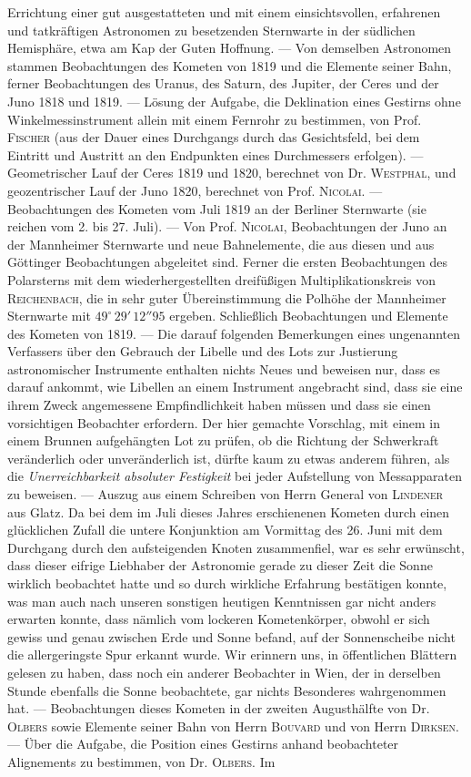 Errichtung einer gut ausgestatteten und mit einem einsichtsvollen, erfahrenen und tatkräftigen Astronomen zu besetzenden Sternwarte in der südlichen Hemisphäre, etwa am Kap der Guten Hoffnung. --- Von demselben Astronomen stammen Beobachtungen des Kometen von 1819 und die Elemente seiner Bahn, ferner Beobachtungen des Uranus, des Saturn, des Jupiter, der Ceres und der Juno 1818 und 1819. --- Lösung der Aufgabe, die Deklination eines Gestirns ohne Winkelmessinstrument allein mit einem Fernrohr zu bestimmen, von Prof. \textsc{Fischer} (aus der Dauer eines Durchgangs durch das Gesichtsfeld, bei dem Eintritt und Austritt an den Endpunkten eines Durchmessers erfolgen). --- Geometrischer Lauf der Ceres 1819 und 1820, berechnet von Dr. \textsc{Westphal}, und geozentrischer Lauf der Juno 1820, berechnet von Prof. \textsc{Nicolai}. --- Beobachtungen des Kometen vom Juli 1819 an der Berliner Sternwarte (sie reichen vom 2. bis 27. Juli). --- Von Prof. \textsc{Nicolai}, Beobachtungen der Juno an der Mannheimer Sternwarte und neue Bahnelemente, die aus diesen und aus Göttinger Beobachtungen abgeleitet sind. Ferner die ersten Beobachtungen des Polarsterns mit dem wiederhergestellten dreifüßigen Multiplikationskreis von \textsc{Reichenbach}, die in sehr guter Übereinstimmung die Polhöhe der Mannheimer Sternwarte mit $49^\circ\,29'\,12''95$ ergeben. Schließlich Beobachtungen und Elemente des Kometen von 1819. --- Die darauf folgenden Bemerkungen eines ungenannten Verfassers über den Gebrauch der Libelle und des Lots zur Justierung astronomischer Instrumente enthalten nichts Neues und beweisen nur, dass es darauf ankommt, wie Libellen an einem Instrument angebracht sind, dass sie eine ihrem Zweck angemessene Empfindlichkeit haben müssen und dass sie einen vorsichtigen Beobachter erfordern. Der hier gemachte Vorschlag, mit einem in einem Brunnen aufgehängten Lot zu prüfen, ob die Richtung der Schwerkraft veränderlich oder unveränderlich ist, dürfte kaum zu etwas anderem führen, als die \emph{Unerreichbarkeit absoluter Festigkeit} bei jeder Aufstellung von Messapparaten zu beweisen. --- Auszug aus einem Schreiben von Herrn General von \textsc{Lindener} aus Glatz. Da bei dem im Juli dieses Jahres erschienenen Kometen durch einen glücklichen Zufall die untere Konjunktion am Vormittag des 26. Juni mit dem Durchgang durch den aufsteigenden Knoten zusammenfiel, war es sehr erwünscht, dass dieser eifrige Liebhaber der Astronomie gerade zu dieser Zeit die Sonne wirklich beobachtet hatte und so durch wirkliche Erfahrung  bestätigen konnte, was man auch nach unseren sonstigen heutigen Kenntnissen gar nicht anders erwarten konnte, dass nämlich vom lockeren Kometenkörper, obwohl er sich gewiss und genau zwischen Erde und Sonne befand, auf der Sonnenscheibe nicht die allergeringste Spur erkannt wurde. Wir erinnern uns, in öffentlichen Blättern gelesen zu haben, dass noch ein anderer Beobachter in Wien, der in derselben Stunde ebenfalls die Sonne beobachtete, gar nichts Besonderes wahrgenommen hat. --- Beobachtungen dieses Kometen in der zweiten Augusthälfte von Dr. \textsc{Olbers} sowie Elemente seiner Bahn von Herrn \textsc{Bouvard} und von Herrn \textsc{Dirksen}. --- Über die Aufgabe, die Position eines Gestirns anhand beobachteter Alignements zu bestimmen, von Dr. \textsc{Olbers}. Im 